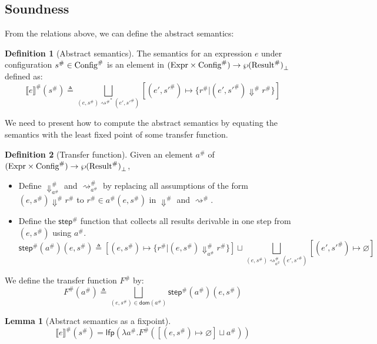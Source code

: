 \documentclass{article}
\theoremstyle{definition}
\newtheorem{definition}{Definition}[section]
\newtheorem{lem}{Lemma}[section]
\newcommand*{\A}[1]{{#1}^{\#}}
\newcommand*{\Expr}{\text{Expr}}
\newcommand*{\Time}{\mathbb{T}}
\newcommand*{\ATime}{\A{\Time}}
\newcommand*{\AConfig}[1]{\A{\text{Config}}\vphantom{#1}}
\newcommand*{\AResult}[1]{\A{\text{Result}}\vphantom{#1}}
\newcommand*{\sembracket}[1]{\lBrack{#1}\rBrack}
\begin{document}
\subsection{Soundness}

From the relations above, we can define the abstract semantics:
\begin{definition}[Abstract semantics]
  The semantics for an expression $e$ under configuration $\A{s}\in\AConfig{\ATime}$ is an element in $(\Expr\times\AConfig{\ATime})\rightarrow{\wp(\AResult{\ATime})}_{\bot}$ defined as:
  \[
    \A{\sembracket{e}}(\A{s})\triangleq\bigsqcup_{(e,\A{s}){\A\rightsquigarrow}^{*}(e',\A{s'})}[(e',\A{s'})\mapsto\{\A{r}|(e',\A{s'})\A\Downarrow \A{r}\}]
  \]
\end{definition}

We need to present how to compute the abstract semantics by equating the semantics with the least fixed point of some transfer function.

\begin{definition}[Transfer function]
  Given an element $\A{a}$ of $(\Expr\times\AConfig{\ATime})\rightarrow{\wp(\AResult{\ATime})}_{\bot}$,

  \begin{itemize}
    \item Define $\A{\Downarrow}_{\A{a}}$ and $\A{\rightsquigarrow}_{\A{a}}$ by replacing all assumptions of the form $(e,\A{s})\A\Downarrow\A{r}$ to $\A{r}\in\A{a}(e,\A{s})$ in $\A\Downarrow$ and $\A\rightsquigarrow$.
    \item Define the $\A{\mathsf{step}}$ function that collects all results derivable in one step from $(e,\A{s})$ using $\A{a}$.
    \[
      \A{\mathsf{step}}(\A{a})(e,\A{s})\triangleq
      [(e,\A{s})\mapsto\{\A{r}|(e,\A{s})\A{\Downarrow}_{\A{a}}\A{r}\}]
      \sqcup
      \bigsqcup_{(e,\A{s})\A{\rightsquigarrow}_{\A{a}}(e',\A{s'})}[(e',\A{s'})\mapsto\varnothing]
    \]
  \end{itemize}

  We define the transfer function $\A{F}$ by:
  \[
    \A{F}(\A{a})\triangleq
    \bigsqcup_{(e,\A{s})\in\mathsf{dom}(\A{a})}
    {\A{\mathsf{step}}(\A{a})(e,\A{s})}
  \]
\end{definition}

\begin{lem}[Abstract semantics as a fixpoint]
  \[
    \A{\sembracket{e}}(\A{s})=\mathsf{lfp}(\lambda \A{a}.\A{F}([(e,\A{s})\mapsto\varnothing]\sqcup\A{a}))
  \]
\end{lem}
\end{document}
